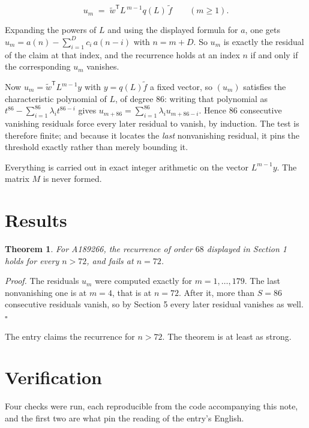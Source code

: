 \documentclass[11pt]{article}
\newtheorem{theorem}{Theorem}
\theoremstyle{definition}
\begin{document}
\[u_m \;=\; \tilde w^{\mathsf T} L^{\,m-1} q(L)\,\tilde f \qquad (m \ge 1).\]

Expanding the powers of $L$ and using the displayed formula for $a$, one gets $u_m = a(n) - \sum_{i=1}^{D} c_i\,a(n-i)$ with $n = m + D$. So $u_m$ is exactly the residual of the claim at that index, and the recurrence holds at an index $n$ if and only if the corresponding $u_m$ vanishes.

Now $u_m = \tilde w^{\mathsf T} L^{m-1} y$ with $y = q(L)\tilde f$ a fixed vector, so $(u_m)$ satisfies the characteristic polynomial of $L$, of degree $86$: writing that polynomial as $t^{86} - \sum_{i=1}^{86} \lambda_i t^{86-i}$ gives $u_{m+86} = \sum_{i=1}^{86} \lambda_i u_{m+86-i}$. Hence $86$ consecutive vanishing residuals force every later residual to vanish, by induction. The test is therefore finite; and because it locates the {\itshape last} nonvanishing residual, it pins the threshold exactly rather than merely bounding it.

Everything is carried out in exact integer arithmetic on the vector $L^{m-1}y$. The matrix $M$ is never formed.

\section{Results}

\begin{theorem} For A189266, the recurrence of order $68$ displayed in Section 1 holds for every $n > 72$, and fails at $n = 72$.\end{theorem}

{\itshape Proof.} The residuals $u_m$ were computed exactly for $m = 1,\dots,179$. The last nonvanishing one is at $m = 4$, that is at $n = 72$. After it, more than $S = 86$ consecutive residuals vanish, so by Section 5 every later residual vanishes as well. $\square$

The entry claims the recurrence for $n > 72$. The theorem is at least as strong.

\section{Verification}

Four checks were run, each reproducible from the code accompanying this note, and the first two are what pin the reading of the entry's English.
\end{document}
